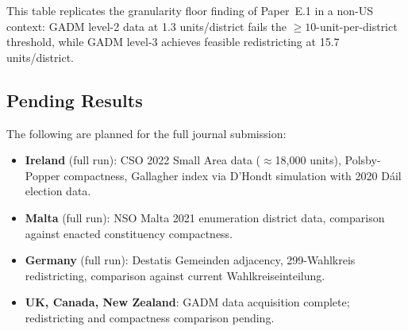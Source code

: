 This table replicates the granularity floor finding of Paper~E.1 in a
non-US context: GADM level-2 data at 1.3 units/district fails the
$\geq 10$-unit-per-district threshold, while GADM level-3 achieves feasible
redistricting at 15.7 units/district.

\subsection{Pending Results}

The following are planned for the full journal submission:

\begin{itemize}
\item \textbf{Ireland} (full run): CSO 2022 Small Area data ($\approx$18{,}000
  units), Polsby-Popper compactness, Gallagher index via D'Hondt simulation
  with 2020 Dáil election data.
\item \textbf{Malta} (full run): NSO Malta 2021 enumeration district data,
  comparison against enacted constituency compactness.
\item \textbf{Germany} (full run): Destatis Gemeinden adjacency,
  299-Wahlkreis redistricting, comparison against current Wahlkreiseinteilung.
\item \textbf{UK, Canada, New Zealand}: GADM data acquisition complete;
  redistricting and compactness comparison pending.
\end{itemize}
